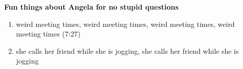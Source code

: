 \documentclass[11pt]{article}
\begin{document}
\textbf{Fun things about Angela for no stupid questions}

\begin{enumerate}
\item weird meeting times, weird meeting times, weird meeting times, weird meeting times (7:27)
\item she calls her friend while she is jogging, she calls her friend while she is jogging
\end{enumerate}
\end{document}
